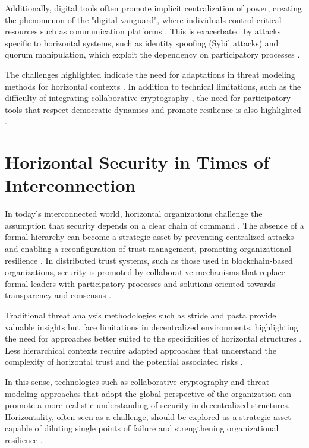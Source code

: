 Additionally, digital tools often promote implicit centralization of power,
creating the phenomenon of the "digital vanguard", where individuals control
critical resources such as communication platforms \cite{SocialMediaTeamsAsDigitalVanguards}.
This is exacerbated by attacks specific to horizontal systems, such as identity spoofing (Sybil
attacks) and quorum manipulation, which exploit the dependency on participatory
processes \cite{MitigationSybilAttack, TheSybilAttack}.

The challenges highlighted indicate the need for adaptations in threat modeling
methods for horizontal contexts \cite{Colbac}. In addition to technical
limitations, such as the difficulty of integrating collaborative cryptography
\cite{AbcCrypto}, the need for participatory tools that respect democratic
dynamics and promote resilience is also highlighted \cite{SecurityCardsToolkit}.

\section{Horizontal Security in Times of Interconnection}
\label{sec:horizontal_security_interconnection}

In today's interconnected world, horizontal organizations challenge the
assumption that security depends on a clear chain of command
\cite{Non-HierarchicalForms, EverydayRevolutions}.
The absence of a formal hierarchy can become a strategic asset by preventing
centralized attacks and enabling a reconfiguration of trust management,
promoting organizational resilience \cite{EverydayRevolutions, Colbac}. In
distributed trust systems, such as those used in blockchain-based organizations,
security is promoted by collaborative mechanisms that replace formal leaders
with participatory processes and solutions oriented towards transparency and
consensus \cite{Reputation-basedDAO, AbcCrypto}.

Traditional threat analysis methodologies such as \gls{stride} and \gls{pasta}
provide valuable insights but face limitations in decentralized environments,
highlighting the need for approaches better suited to the specificities of
horizontal structures \cite{ThreatModellingSurvey,
ThreatModelingASummaryOfAvailableMethods}. Less hierarchical contexts require
adapted approaches that understand the complexity of horizontal trust and the
potential associated risks \cite{Colbac}.

In this sense, technologies such as collaborative cryptography \cite{Colbac,
AbcCrypto} and threat modeling approaches that adopt the global perspective of
the organization can promote a more realistic understanding of security in
decentralized structures. Horizontality, often seen as a challenge, should be
explored as a strategic asset capable of diluting single points of failure and
strengthening organizational resilience \cite{EverydayRevolutions}.

